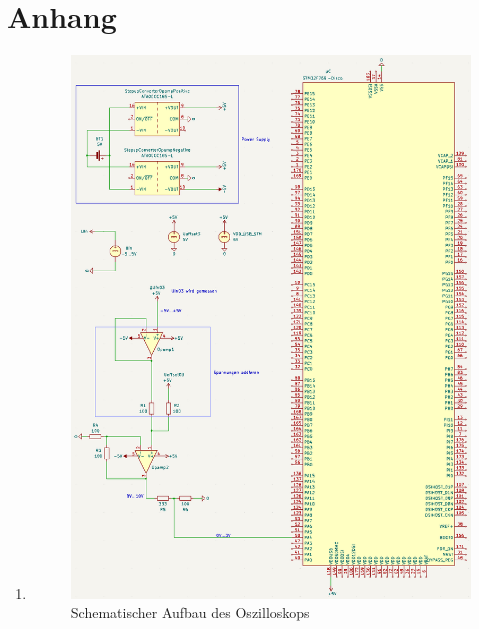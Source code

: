 \section*{Anhang}
\label{Anhang}

\begin{enumerate}
	\item
	\label{Schematic_all}
		\begin{figure}[h!]
			\centering
			\includegraphics[width=\textwidth, scale=0.1]{images/schematic_opamps3.png}
			\caption{Schematischer Aufbau des Oszilloskops}
		\end{figure}
\end{enumerate}
